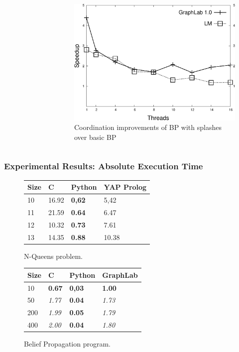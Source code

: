 \documentclass{beamer}
\begin{document}
\begin{frame}[fragile]
\begin{columns}
\begin{figure}[b]
      \end{figure}
      \begin{figure}[b]
         \includegraphics[width=\textwidth]{coord/improv_bp-graphlab-400.pdf}
         \caption{Coordination improvements of BP with splashes over basic BP}
      \end{figure}
   \end{columns}
\end{frame}

\begin{frame}[fragile]
   \frametitle{Experimental Results: Absolute Execution Time}
   \begin{figure}[b]
      \begin{tabular}{ | l | l | l | l |}
       \hline

       Size & C & Python & YAP Prolog \\ \hline\hline
       10 & 16.92 & \textbf{0,62} & 5,42 \\
       11 & 21.59 & \textbf{0.64} & 6.47 \\
       12 & 10.32 & \textbf{0.73} & 7.61 \\
       13 & 14.35 & \textbf{0.88} & 10.38 \\
       \hline
       \end{tabular}
       \caption{N-Queens problem.}
    \end{figure}
    \begin{figure}[b]
       \begin{tabular}{ | l | l | l | l |}
        \hline

        Size & C & Python & GraphLab \\ \hline\hline
        10 & \textbf{0.67} & \textbf{0,03} & \textbf{1.00} \\
        50 & \textit{1.77} & \textbf{0.04} & \textit{1.73} \\
        200 & \textit{1.99} & \textbf{0.05} & \textit{1.79} \\
        400 & \textit{2.00} & \textbf{0.04} & \textit{1.80} \\
        \hline
        \end{tabular}
        \caption{Belief Propagation program.}
    \end{figure}
\end{frame}
\end{document}
